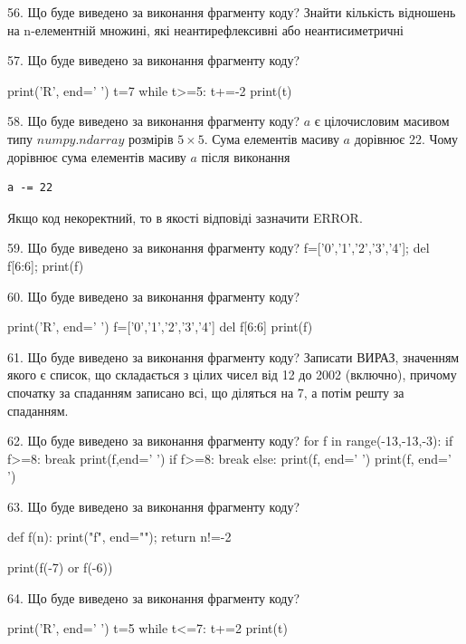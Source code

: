 \documentclass[11pt]{article}
\begin{document}
56. Що буде виведено за виконання фрагменту коду?
Знайти кількість відношень на n-елементній множині, які неантирефлексивні або неантисиметричні

57. Що буде виведено за виконання фрагменту коду?

print('R', end=' ')
t=7
while t>=5:
    t+=-2
print(t)



58. Що буде виведено за виконання фрагменту коду?
$a$ є цілочисловим масивом типу $numpy.ndarray$ розмірів $5{\times}5$. Сума елементів масиву $a$ дорівнює 22. Чому дорівнює сума елементів масиву $a$ після виконання 
\begin{verbatim}
a -= 22
\end{verbatim}


Якщо код некоректний, то в якості відповіді зазначити ERROR.




59. Що буде виведено за виконання фрагменту коду?
f=['0','1','2','3','4']; del f[6:6]; print(f)

60. Що буде виведено за виконання фрагменту коду?

print('R', end=' ')
f=['0','1','2','3','4']
del f[6:6]
print(f)



61. Що буде виведено за виконання фрагменту коду?
Записати ВИРАЗ, значенням якого є список, що складається з цілих чисел від 12 до 2002 (включно), причому спочатку за спаданням записано всі, що діляться на 7, а потім решту за спаданням.

62. Що буде виведено за виконання фрагменту коду?
for f in range(-13,-13,-3):
    if f>=8:
        break
        print(f,end=' ')
    if f>=8:
        break
else:
    print(f, end=' ')
print(f, end=' ')


63. Що буде виведено за виконання фрагменту коду?

def f(n):
    print("f", end="");
    return n!=-2

print(f(-7) or f(-6))


64. Що буде виведено за виконання фрагменту коду?

print('R', end=' ')
t=5
while t<=7:
    t+=2
print(t)


\end{document}
